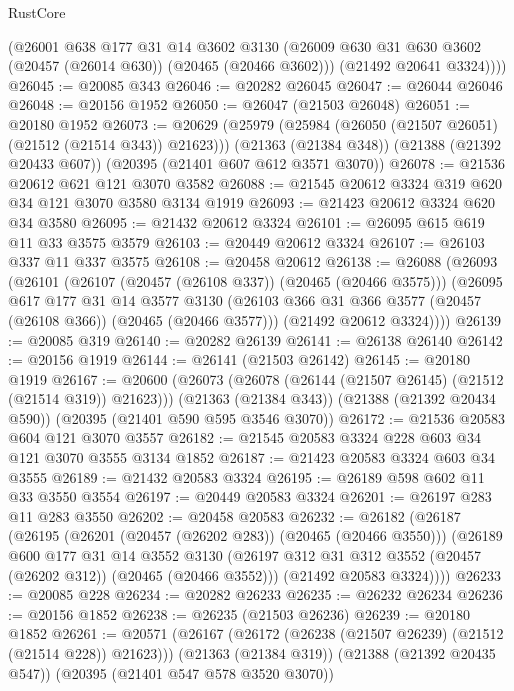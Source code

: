 \begin{lexlean}{RustCore}
\begin{coremodule}
        (@26001
          @638
          @177
          @31
          @14
          @3602
          @3130
          (@26009 @630 @31 @630 @3602 (@20457 (@26014 @630)) (@20465 (@20466 @3602)))
          (@21492 @20641 @3324))))
@26045 := @20085 @343
@26046 := @20282 @26045
@26047 := @26044 @26046
@26048 := @20156 @1952
@26050 := @26047 (@21503 @26048)
@26051 := @20180 @1952
@26073 := @20629
    (@25979 (@25984 (@26050 (@21507 @26051) (@21512 (@21514 @343)) @21623)))
    (@21363 (@21384 @348))
    (@21388 (@21392 @20433 @607))
    (@20395 (@21401 @607 @612 @3571 @3070))
@26078 := @21536 @20612 @621 @121 @3070 @3582
@26088 := @21545 @20612 @3324 @319 @620 @34 @121 @3070 @3580 @3134 @1919
@26093 := @21423 @20612 @3324 @620 @34 @3580
@26095 := @21432 @20612 @3324
@26101 := @26095 @615 @619 @11 @33 @3575 @3579
@26103 := @20449 @20612 @3324
@26107 := @26103 @337 @11 @337 @3575
@26108 := @20458 @20612
@26138 := @26088
    (@26093
      (@26101
        (@26107 (@20457 (@26108 @337)) (@20465 (@20466 @3575)))
        (@26095
          @617
          @177
          @31
          @14
          @3577
          @3130
          (@26103 @366 @31 @366 @3577 (@20457 (@26108 @366)) (@20465 (@20466 @3577)))
          (@21492 @20612 @3324))))
@26139 := @20085 @319
@26140 := @20282 @26139
@26141 := @26138 @26140
@26142 := @20156 @1919
@26144 := @26141 (@21503 @26142)
@26145 := @20180 @1919
@26167 := @20600
    (@26073 (@26078 (@26144 (@21507 @26145) (@21512 (@21514 @319)) @21623)))
    (@21363 (@21384 @343))
    (@21388 (@21392 @20434 @590))
    (@20395 (@21401 @590 @595 @3546 @3070))
@26172 := @21536 @20583 @604 @121 @3070 @3557
@26182 := @21545 @20583 @3324 @228 @603 @34 @121 @3070 @3555 @3134 @1852
@26187 := @21423 @20583 @3324 @603 @34 @3555
@26189 := @21432 @20583 @3324
@26195 := @26189 @598 @602 @11 @33 @3550 @3554
@26197 := @20449 @20583 @3324
@26201 := @26197 @283 @11 @283 @3550
@26202 := @20458 @20583
@26232 := @26182
    (@26187
      (@26195
        (@26201 (@20457 (@26202 @283)) (@20465 (@20466 @3550)))
        (@26189
          @600
          @177
          @31
          @14
          @3552
          @3130
          (@26197 @312 @31 @312 @3552 (@20457 (@26202 @312)) (@20465 (@20466 @3552)))
          (@21492 @20583 @3324))))
@26233 := @20085 @228
@26234 := @20282 @26233
@26235 := @26232 @26234
@26236 := @20156 @1852
@26238 := @26235 (@21503 @26236)
@26239 := @20180 @1852
@26261 := @20571
    (@26167 (@26172 (@26238 (@21507 @26239) (@21512 (@21514 @228)) @21623)))
    (@21363 (@21384 @319))
    (@21388 (@21392 @20435 @547))
    (@20395 (@21401 @547 @578 @3520 @3070))

\end{coremodule}
\end{lexlean}
